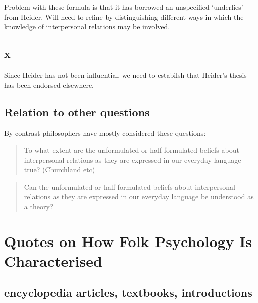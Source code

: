 \documentclass[12pt,\papersize]{extarticle}
\begin{document}
Problem with these formula is that it has borrowed an unspecified `underlies' from Heider. Will need to refine by distinguishing different ways in which the knowledge of interpersonal relations may be involved.

\hypertarget{x-1}{%
\subsection{x}\label{x-1}}

Since Heider has not been influential, we need to estabilsh that Heider's thesis has been endorsed elsewhere.

\hypertarget{relation-to-other-questions}{%
\subsection{Relation to other questions}\label{relation-to-other-questions}}

By contrast philosophers have mostly considered these questions:

\begin{quote}
To what extent are the unformulated or half-formulated beliefs about interpersonal relations as they are expressed in our everyday language true? (Churchland etc)
\end{quote}

\begin{quote}
Can the unformulated or half-formulated beliefs about interpersonal relations as they are expressed in our everyday language be understood as a theory?
\end{quote}

\hypertarget{quotes-on-how-folk-psychology-is-characterised}{%
\section{Quotes on How Folk Psychology Is Characterised}\label{quotes-on-how-folk-psychology-is-characterised}}

\label{unit:../../quotes}

\hypertarget{encyclopedia-articles-textbooks-introductions}{%
\subsection{encyclopedia articles, textbooks, introductions}\label{encyclopedia-articles-textbooks-introductions}}
\end{document}
